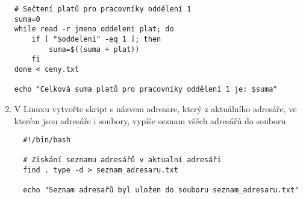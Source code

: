 \documentclass{article}
\begin{document}
\begin{enumerate}
\begin{lstlisting}[caption=skript secti.sh]
# Sečtení platů pro pracovníky oddělení 1
suma=0
while read -r jmeno oddeleni plat; do
    if [ "$oddeleni" -eq 1 ]; then
        suma=$((suma + plat))
    fi
done < ceny.txt

echo "Celková suma platů pro pracovníky oddělení 1 je: $suma"
\end{lstlisting}
\item V Linuxu vytvořte skript s názvem adresare, který z aktuálního adresáře, ve kterém jsou adresáře i soubory, vypíše seznam všěch adresářů do souboru
\begin{lstlisting}
  #!/bin/bash

  # Získání seznamu adresářů v aktualní adresáři
  find . type -d > seznam_adresaru.txt

  echo "Seznam adresařů byl uložen do souboru seznam_adresaru.txt"
\end{lstlisting}
\end{enumerate}
\end{document}
